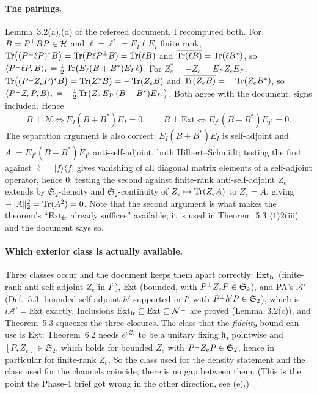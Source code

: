 \documentclass[11pt]{article}
\newcommand{\Stwo}{\mathfrak S_2}\newcommand{\Sone}{\mathfrak S_1}
\newcommand{\norm}[1]{\lVert #1\rVert}\newcommand{\abs}[1]{\lvert #1\rvert}
\newcommand{\ip}[2]{\langle #1,#2\rangle}\newcommand{\one}{\mathbf 1}
\newcommand{\Ext}{\mathrm{Ext}}\newcommand{\Nvis}{\mathcal N}
\begin{document}
\paragraph{The pairings.}  Lemma~3.2(a),(d) of the refereed document.  I recomputed both.
For $B=P^{\perp} BP\in\mathcal H$ and $\ell=\ell^*=E_I\ell E_I$ finite rank,
$\operatorname{Tr}\bigl((P^{\perp}\ell P)^*B\bigr)=\operatorname{Tr}(P\ell P^{\perp} B)=\operatorname{Tr}(\ell B)$ and
$\overline{\operatorname{Tr}(\ell B)}=\operatorname{Tr}(\ell B^*)$, so
$\ip{\Pperp\ell P}B_r=\tfrac12\Tr\bigl(E_I(B+B^*)E_I\,\ell\bigr)$.  For
$Z_e^*=-Z_e=E_{I^c}Z_eE_{I^c}$,
$\operatorname{Tr}\bigl((P^{\perp} Z_eP)^*B\bigr)=\operatorname{Tr}(Z_e^*B)=-\operatorname{Tr}(Z_eB)$ and
$\overline{\operatorname{Tr}(Z_eB)}=-\operatorname{Tr}(Z_eB^*)$, so
$\ip{\Pperp Z_eP}B_r=-\tfrac12\Tr\bigl(Z_e\,E_{I^c}(B-B^*)E_{I^c}\bigr)$.  Both agree with
the document, signs included.  Hence
\begin{equation}\label{eq:twoconds}
 B\perp\Nvis\iff E_I(B+B^*)E_I=0,\qquad B\perp\Ext\iff E_{I^c}(B-B^*)E_{I^c}=0 .
\end{equation}
The separation argument is also correct: $E_I(B+B^*)E_I$ is self-adjoint and
$A:=E_{I^c}(B-B^*)E_{I^c}$ anti-self-adjoint, both Hilbert--Schmidt; testing the first
against $\ell=\lvert f\rangle\langle f\rvert$ gives vanishing of all diagonal matrix
elements of a self-adjoint operator, hence $0$; testing the second against finite-rank
anti-self-adjoint $Z_e$ extends by $\Stwo$-density and $\Stwo$-continuity of
$Z_e\mapsto\operatorname{Tr}(Z_eA)$ to $Z_e=A$, giving $-\norm A_2^2=\Tr(A^2)=0$.  Note that the second
argument is what makes the theorem's ``$\Ext_{\rm fr}$ already suffices'' available; it is
used in Theorem~5.3 $\langle1\rangle2$(iii) and the document says so.

\paragraph{Which exterior class is actually available.}  Three classes occur and the
document keeps them apart correctly: $\Ext_{\rm fr}$ (finite-rank anti-self-adjoint
$Z_e$ in $I^c$), $\Ext$ (bounded, with $\Pperp Z_eP\in\Stwo$), and PA's $\mathcal A'$
(Def.~5.3: bounded self-adjoint $h'$ supported in $I'$ with $\Pperp h'P\in\Stwo$), which is
$i\mathcal A'=\Ext$ exactly.  Inclusions $\Ext_{\rm fr}\subseteq\Ext\subseteq\Nvis^{\perp}$
are proved (Lemma~3.2(c)), and Theorem~5.3 squeezes the three closures.  The class that
the \emph{fidelity} bound can use is $\Ext$: Theorem~6.2 needs $e^{sZ_e}$ to be a unitary
fixing $\mathfrak h_I$ pointwise and $[P,Z_e]\in\Stwo$, which holds for bounded $Z_e$ with
$\Pperp Z_eP\in\Stwo$, hence in particular for finite-rank $Z_e$.  So the class used for the
density statement and the class used for the channels coincide; there is no gap between
them.  (This is the point the Phase-4 brief got wrong in the other direction, see (e).)
\end{document}
